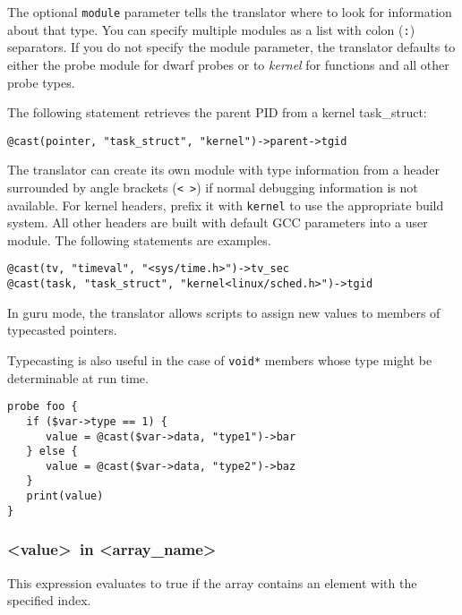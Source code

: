 \documentclass[twoside,english]{article}
\newenvironment{vindent}
{\begin{list}{}{\setlength{\listparindent}{6pt}}
\item[]}
{\end{list}}
\begin{document}
The optional \texttt{module} parameter tells the translator where to
look for information about that type. You can specify multiple modules
as a list with colon (\texttt{:}) separators. If you do not specify
the module parameter, the translator defaults to either the probe
module for dwarf probes or to \textit{kernel} for functions and all
other probe types.

The following statement retrieves the parent PID from a kernel
task\_struct:
\begin{vindent}
\begin{verbatim}
@cast(pointer, "task_struct", "kernel")->parent->tgid
\end{verbatim}
\end{vindent}

The translator can create its own module with type information from a
header surrounded by angle brackets (\texttt{< >}) if normal debugging
information is not available.  For kernel headers, prefix it with
\texttt{kernel} to use the appropriate build system.  All other
headers are built with default GCC parameters into a user module. The
following statements are examples.
\begin{vindent}
\begin{verbatim}
@cast(tv, "timeval", "<sys/time.h>")->tv_sec
@cast(task, "task_struct", "kernel<linux/sched.h>")->tgid
\end{verbatim}
\end{vindent}

In guru mode, the translator allows scripts to assign new values to
members of typecasted pointers.

Typecasting is also useful in the case of \texttt{void*} members whose
type might be determinable at run time.
\begin{vindent}
\begin{verbatim}
probe foo {
   if ($var->type == 1) {
      value = @cast($var->data, "type1")->bar
   } else {
      value = @cast($var->data, "type2")->baz
   }
   print(value)
}
\end{verbatim}
\end{vindent}


\subsubsection{\textless value\textgreater\ in \textless array\_name\textgreater}
This expression evaluates to true if the array contains an element with the
specified index.
\end{document}
